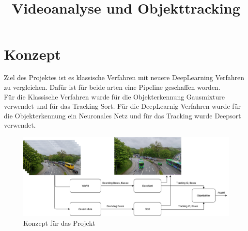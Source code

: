 \documentclass[conference]{IEEEtran}
\begin{document}
	
	\title{Videoanalyse und Objekttracking}
	
	\author{
	}

	\author{
	}
	
	\author{
	}
	
	\maketitle
	
	\begin{abstract}
		
	\end{abstract}
	
	\section{Konzept}
	Ziel des Projektes ist es klassische Verfahren mit neuere DeepLearning Verfahren zu vergleichen.
	Dafür ist für beide arten eine Pipeline geschaffen worden.\\
	Für die Klassische Verfahren wurde für die Objekterkennung Gausmixture verwendet und für das Tracking Sort. Für die DeepLearnig Verfahren wurde für die Objekterkennung ein Neuronales Netz  und für das Tracking wurde Deepsort verwendet.
	
	\begin{figure}[h]
		\begin{center}
			\includegraphics[width=17cm]{Media/KonzeptVAOT.png}
			\caption{Konzept für das Projekt}
			\label{Konzept}
		\end{center}
	\end{figure}
	
\end{document}
